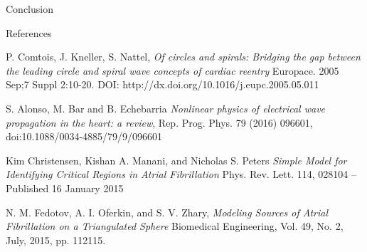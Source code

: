 \documentclass[final,hyperref={pdfpagelabels=false}]{beamer}
\begin{document}
\begin{frame}[t]
\begin{columns}[t]
\begin{column}{.465\textwidth}
\begin{block}{Conclusion}
\end{block}


\begin{block}{References}
\begin{thebibliography}{1}

P. Comtois, J. Kneller, S. Nattel,
\emph{Of circles and spirals: Bridging the gap between the leading circle and spiral wave concepts of cardiac reentry}
Europace. 2005 Sep;7 Suppl 2:10-20.
DOI: http://dx.doi.org/10.1016/j.eupc.2005.05.011



S. Alonso, M. Bar and B. Echebarria
\emph{Nonlinear physics of electrical wave
propagation in the heart: a review},
Rep. Prog. Phys. 79 (2016) 096601, 
doi:10.1088/0034-4885/79/9/096601

Kim Christensen, Kishan A. Manani, and Nicholas S. Peters
\emph{Simple Model for Identifying Critical Regions in Atrial Fibrillation}
Phys. Rev. Lett. 114, 028104 – Published 16 January 2015



N. M. Fedotov,  A. I. Oferkin, and S. V. Zhary,
\emph{Modeling Sources of Atrial Fibrillation on a Triangulated Sphere}
Biomedical Engineering, Vol. 49, No. 2, July, 2015, pp. 112115. 
\end{thebibliography}

\end{block}








\end{column}
\end{columns}
\end{frame}
\end{document}
